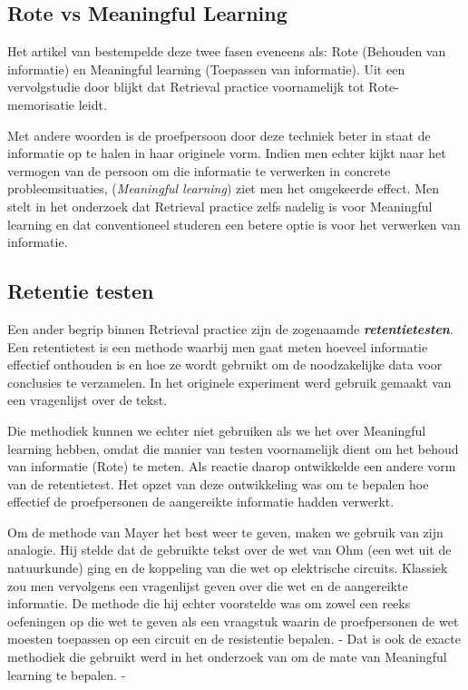 \documentclass{hogent-article}
\newcommand{\boldit}[1]{\emph{\textbf{#1}}}
\begin{document}
\subsection{Rote vs Meaningful Learning}
\label{RoteVSMeaningful}
Het artikel van \textcite{Mayer_2002} bestempelde deze twee fasen eveneens als: Rote (Behouden van informatie) en Meaningful learning (Toepassen van informatie). Uit een vervolgstudie door \textcite{van_Gog_2012} blijkt dat Retrieval practice voornamelijk tot Rote-memorisatie leidt.\\

\par
\noindent
Met andere woorden is de proefpersoon door deze techniek beter in staat de informatie op te halen in haar originele vorm. Indien men echter kijkt naar het vermogen van de persoon om die informatie te verwerken in concrete probleemsituaties, (\textit{Meaningful learning}) ziet men het omgekeerde effect. Men stelt in het onderzoek dat Retrieval practice zelfs nadelig is voor Meaningful learning en dat conventioneel studeren een betere optie is voor het verwerken van informatie.
\par
\noindent

\subsection{Retentie testen}
\label{RT}
Een ander begrip binnen Retrieval practice zijn de zogenaamde \boldit{retentietesten}. Een retentietest is een methode waarbij men gaat meten hoeveel informatie effectief onthouden is en hoe ze wordt gebruikt om de noodzakelijke data voor conclusies te verzamelen. In het originele experiment \textcite{Roediger_2006} werd gebruik gemaakt van een vragenlijst over de tekst.\\

\par
\noindent
Die methodiek kunnen we echter niet gebruiken als we het over Meaningful learning hebben, omdat die manier van testen voornamelijk dient om het behoud van informatie (Rote) te meten. Als reactie daarop ontwikkelde \textcite{Mayer_2002} een andere vorm van de retentietest. Het opzet van deze ontwikkeling was om te bepalen hoe effectief de proefpersonen de aangereikte informatie hadden verwerkt.\\
\par
\noindent
Om de methode van Mayer het best weer te geven, maken we gebruik van zijn analogie. Hij stelde dat de gebruikte tekst over de wet van Ohm (een wet uit de natuurkunde) ging en de koppeling van die wet op elektrische circuits. Klassiek zou men vervolgens een vragenlijst geven over die wet en de aangereikte informatie. De methode die hij echter voorstelde was om zowel een reeks oefeningen op die wet te geven als een vraagstuk waarin de proefpersonen de wet moesten toepassen op een circuit en de resistentie bepalen. - Dat is ook de exacte methodiek die gebruikt werd in het onderzoek van \textcite{van_Gog_2012} om de mate van Meaningful learning te bepalen. -
\end{document}
